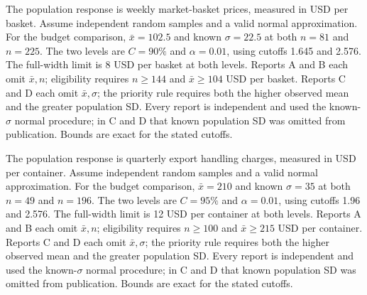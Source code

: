 The population response is weekly market-basket prices, measured in USD per basket. Assume independent random samples and a valid normal approximation. For the budget comparison, $\bar x=102.5$ and known $\sigma=22.5$ at both $n=81$ and $n=225$. The two levels are $C=90\%$ and $\alpha=0.01$, using cutoffs 1.645 and 2.576. The full-width limit is 8 USD per basket at both levels.
Reports A and B each omit $\bar x,n$; eligibility requires $n\ge144$ and $\bar x\ge104$ USD per basket. Reports C and D each omit $\bar x,\sigma$; the priority rule requires both the higher observed mean and the greater population SD. Every report is independent and used the known-$\sigma$ normal procedure; in C and D that known population SD was omitted from publication. Bounds are exact for the stated cutoffs.

The population response is quarterly export handling charges, measured in USD per container. Assume independent random samples and a valid normal approximation. For the budget comparison, $\bar x=210$ and known $\sigma=35$ at both $n=49$ and $n=196$. The two levels are $C=95\%$ and $\alpha=0.01$, using cutoffs 1.96 and 2.576. The full-width limit is 12 USD per container at both levels.
Reports A and B each omit $\bar x,n$; eligibility requires $n\ge100$ and $\bar x\ge215$ USD per container. Reports C and D each omit $\bar x,\sigma$; the priority rule requires both the higher observed mean and the greater population SD. Every report is independent and used the known-$\sigma$ normal procedure; in C and D that known population SD was omitted from publication. Bounds are exact for the stated cutoffs.

\par\clearpage
\endgroup




